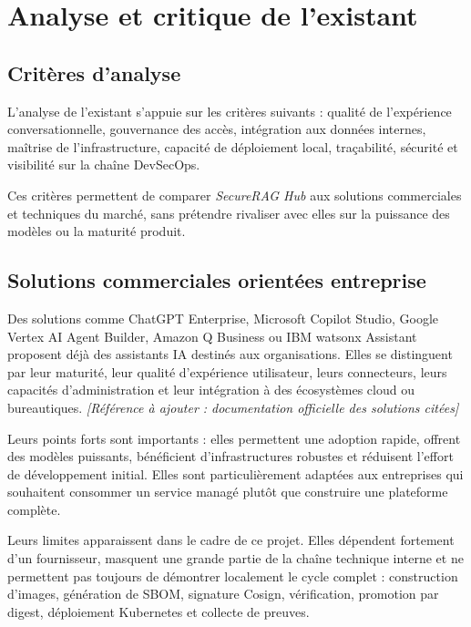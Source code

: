 \section{Analyse et critique de l'existant}

\subsection{Critères d'analyse}

L'analyse de l'existant s'appuie sur les critères suivants : qualité de l'expérience conversationnelle, gouvernance des accès, intégration aux données internes, maîtrise de l'infrastructure, capacité de déploiement local, traçabilité, sécurité et visibilité sur la chaîne DevSecOps.

Ces critères permettent de comparer \textit{SecureRAG Hub} aux solutions commerciales et techniques du marché, sans prétendre rivaliser avec elles sur la puissance des modèles ou la maturité produit.

\subsection{Solutions commerciales orientées entreprise}

Des solutions comme ChatGPT Enterprise, Microsoft Copilot Studio, Google Vertex AI Agent Builder, Amazon Q Business ou IBM watsonx Assistant proposent déjà des assistants IA destinés aux organisations. Elles se distinguent par leur maturité, leur qualité d'expérience utilisateur, leurs connecteurs, leurs capacités d'administration et leur intégration à des écosystèmes cloud ou bureautiques. \textit{[Référence à ajouter : documentation officielle des solutions citées]}

Leurs points forts sont importants : elles permettent une adoption rapide, offrent des modèles puissants, bénéficient d'infrastructures robustes et réduisent l'effort de développement initial. Elles sont particulièrement adaptées aux entreprises qui souhaitent consommer un service managé plutôt que construire une plateforme complète.

Leurs limites apparaissent dans le cadre de ce projet. Elles dépendent fortement d'un fournisseur, masquent une grande partie de la chaîne technique interne et ne permettent pas toujours de démontrer localement le cycle complet : construction d'images, génération de SBOM, signature Cosign, vérification, promotion par digest, déploiement Kubernetes et collecte de preuves.

